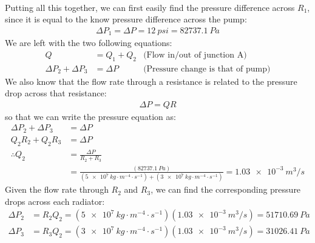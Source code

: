 \begin{solution}
\begin{parts}
\begin{itemize}
\begin{align*}
			\end{align*}
		\end{itemize}
		Putting all this together, we can first easily find the pressure difference across $R_1$, since it is equal to the know pressure difference across the pump:
		\begin{align*}
		\Delta P_1 = \Delta P=\SI{12}{psi}=\SI{82737.1}{Pa}
		\end{align*}
		We are left with the two following equations:
		\begin{align*}
		Q&=Q_1+Q_2 &\text{(Flow in/out of junction A)}\\
		\Delta P_2 + \Delta P_3 &= \Delta P &\text{(Pressure change is that of pump)}
		\end{align*}
		We also know that the flow rate through a resistance is related to the pressure drop across that resistance:
		\begin{align*}
		\Delta P = QR
		\end{align*}
		so that we can write the pressure equation as:
		\begin{align*}
		\Delta P_2 + \Delta P_3 &= \Delta P\\
		Q_2R_2+Q_2R_3&= \Delta P\\
		\therefore Q_2 &=\frac{\Delta P}{R_2+R_3}\\
		&=\frac{(\SI{82737.1}{Pa})}{(\SI{5e7}{kg\cdot m^{-4}\cdot s^{-1}})+(\SI{3e7}{kg\cdot m^{-4}\cdot s^{-1}})}=\SI{1.03e-3}{m^3/s}
		\end{align*}
		Given the flow rate through $R_2$ and $R_3$, we can find the corresponding pressure drops across each radiator:
		\begin{align*}
		\Delta P_2&= R_2Q_2=(\SI{5e7}{kg\cdot m^{-4}\cdot s^{-1}})(\SI{1.03e-3}{m^3/s})=\SI{51710.69}{Pa}\\
		\Delta P_3&= R_3Q_2=(\SI{3e7}{kg\cdot m^{-4}\cdot s^{-1}})(\SI{1.03e-3}{m^3/s})=\SI{31026.41}{Pa}\\
		\end{align*}

\end{parts}
\end{solution}
